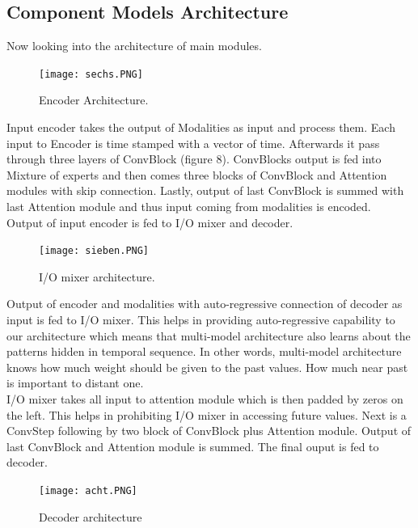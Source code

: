 \documentclass[12pt]{article}
\begin{document}
\subsection{Component Models Architecture}
Now looking into the architecture of main modules.
\begin{center}
\begin{figure}[h]
  \centering
  \begin{minipage}[b]{1.0\textwidth}
    \centering
    \texttt{[image: sechs.PNG]}
      \centering
    \caption{Encoder Architecture. \cite{KaiserGSVPJU17}}
  \end{minipage}
\end{figure}
\end{center}
Input encoder takes the output of Modalities as input and process them. Each input to Encoder is time stamped with a vector of time. Afterwards it pass through three layers of ConvBlock (figure 8). ConvBlocks output is fed into Mixture of experts and then comes three blocks of ConvBlock and Attention modules with skip connection. Lastly, output of last ConvBlock is summed with last Attention module and thus input coming from modalities is encoded.\\
Output of input encoder is fed to I/O mixer and decoder.
\begin{center}
\begin{figure}[h]
  \centering
  \begin{minipage}[b]{1.0\textwidth}
    \centering
    \texttt{[image: sieben.PNG]}
      \centering
    \caption{I/O mixer architecture. \cite{KaiserGSVPJU17}}
  \end{minipage}
\end{figure}
\end{center}
Output of encoder and modalities with auto-regressive connection of decoder as input is fed to I/O mixer. This helps in providing auto-regressive capability to our architecture which means that multi-model architecture also learns about the patterns hidden in temporal sequence. In other words, multi-model architecture knows how much weight should be given to the past values. How much near past is important to distant one.\\
I/O mixer takes all input to attention module which is then padded by zeros on the left. This helps in prohibiting I/O mixer in accessing future values. Next is a ConvStep following by two block of ConvBlock plus Attention module. Output of last ConvBlock and Attention module is summed. The final ouput is fed to decoder.
\begin{center}
\begin{figure}[h]
  \centering
  \begin{minipage}[b]{1.0\textwidth}
    \centering
    \texttt{[image: acht.PNG]}
      \centering
    \caption{Decoder architecture\cite{KaiserGSVPJU17}}
  \end{minipage}
\end{figure}
\end{center}
\end{document}
